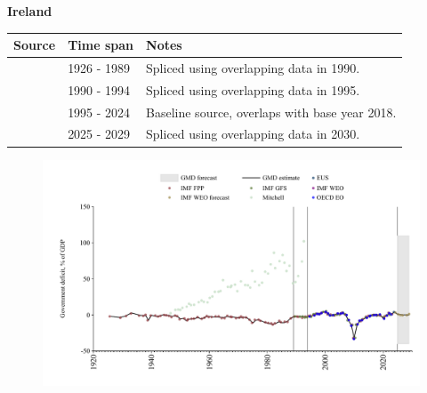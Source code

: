 \documentclass[12pt,a4paper,landscape]{article}
\begin{document}
\begin{adjustbox}{max totalsize={\paperwidth}{\paperheight},center}
\begin{minipage}[t][\textheight][t]{\textwidth}
\vspace*{0.5cm}
{}
\begin{center}
{\Large\bfseries Ireland}
\end{center}
\vspace{0.5cm}
\begin{table}[H]
\centering
\small
\begin{tabular}{|l|l|l|}
\hline
\textbf{Source} & \textbf{Time span} & \textbf{Notes} \\
\hline
\rowcolor{white}\cite{IMF_FPP}& 1926 - 1989 &Spliced using overlapping data in 1990.\\
\rowcolor{lightgray}\cite{IMF_GFS}& 1990 - 1994 &Spliced using overlapping data in 1995.\\
\rowcolor{white}\cite{EUS}& 1995 - 2024 &Baseline source, overlaps with base year 2018.\\
\rowcolor{lightgray}\cite{IMF_WEO_forecast}& 2025 - 2029 &Spliced using overlapping data in 2030.\\
\hline
\end{tabular}
\end{table}
\begin{figure}[H]
\centering
\includegraphics[width=\textwidth,height=0.6\textheight,keepaspectratio]{graphs/IRL_govdef_GDP.pdf}
\end{figure}
\end{minipage}
\end{adjustbox}
\end{document}
